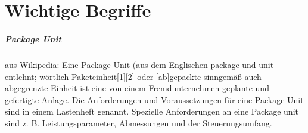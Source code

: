\chapter{Wichtige Begriffe}
\paragraph*{Package Unit}
aus Wikipedia: \hfill \newline
Eine Package Unit (aus dem Englischen package und unit entlehnt; wörtlich Paketeinheit[1][2] oder [ab]gepackte sinngemäß auch abgegrenzte Einheit ist eine von einem Fremdunternehmen geplante und gefertigte Anlage. Die Anforderungen und Voraussetzungen für eine Package Unit sind in einem Lastenheft genannt. Spezielle Anforderungen an eine Package unit sind z. B. Leistungsparameter, Abmessungen und der Steuerungsumfang.
